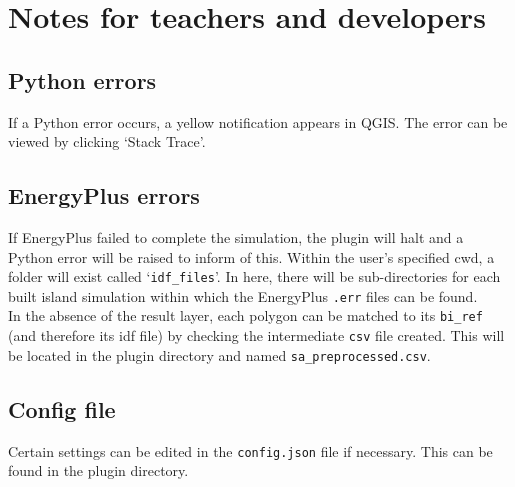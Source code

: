 \documentclass{article}
\begin{document}
\clearpage
\appendix
\section{Notes for teachers and developers}
\subsection{Python errors}
If a Python error occurs, a yellow notification appears in QGIS. The error can be viewed by clicking `Stack Trace'.

\subsection{EnergyPlus errors}
If EnergyPlus failed to complete the simulation, the plugin will halt and a Python error will be raised to inform of this. Within the user's specified cwd, a folder will exist called `\texttt{idf\_files}'. In here, there will be sub-directories for each built island simulation within which the EnergyPlus \texttt{.err} files can be found. \\

In the absence of the result layer, each polygon can be matched to its \texttt{bi\_ref} (and therefore its idf file) by checking the intermediate \texttt{csv} file created. This will be located in the plugin directory and named \texttt{sa\_preprocessed.csv}.

\subsection{Config file}
Certain settings can be edited in the \texttt{config.json} file if necessary. This can be found in the plugin directory. \\
\end{document}
